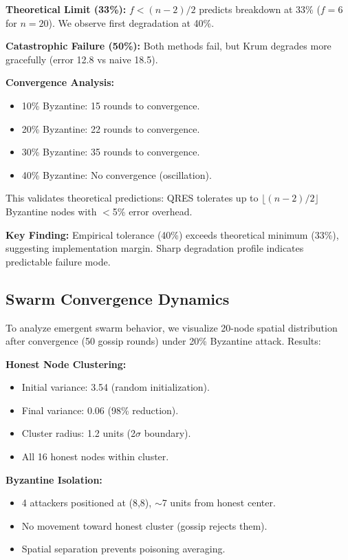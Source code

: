 \documentclass[conference,10pt]{IEEEtran}
\begin{document}
\textbf{Theoretical Limit (33\%):} $f < (n-2)/2$ predicts breakdown at 33\% ($f=6$ for $n=20$). We observe first degradation at 40\%.

\textbf{Catastrophic Failure (50\%):} Both methods fail, but Krum degrades more gracefully (error 12.8 vs naive 18.5).

\textbf{Convergence Analysis:}
\begin{itemize}
    \item 10\% Byzantine: 15 rounds to convergence.
    \item 20\% Byzantine: 22 rounds to convergence.
    \item 30\% Byzantine: 35 rounds to convergence.
    \item 40\% Byzantine: No convergence (oscillation).
\end{itemize}

This validates theoretical predictions: QRES tolerates up to $\lfloor(n-2)/2\rfloor$ Byzantine nodes with $<$5\% error overhead.

\textbf{Key Finding:} Empirical tolerance (40\%) exceeds theoretical minimum (33\%), suggesting implementation margin. Sharp degradation profile indicates predictable failure mode.

\subsection{Swarm Convergence Dynamics}

To analyze emergent swarm behavior, we visualize 20-node spatial distribution after convergence (50 gossip rounds) under 20\% Byzantine attack. Results:

\textbf{Honest Node Clustering:}
\begin{itemize}
    \item Initial variance: 3.54 (random initialization).
    \item Final variance: 0.06 (98\% reduction).
    \item Cluster radius: 1.2 units (2$\sigma$ boundary).
    \item All 16 honest nodes within cluster.
\end{itemize}

\textbf{Byzantine Isolation:}
\begin{itemize}
    \item 4 attackers positioned at (8,8), $\sim$7 units from honest center.
    \item No movement toward honest cluster (gossip rejects them).
    \item Spatial separation prevents poisoning averaging.
\end{itemize}
\end{document}
